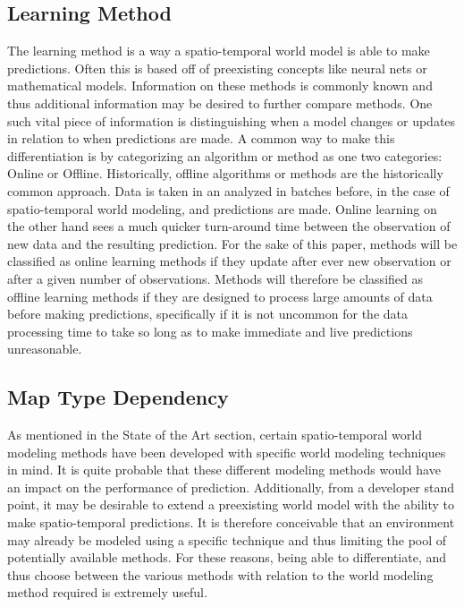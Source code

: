   \subsection{ Learning Method }
  The learning method is a way a spatio-temporal world model is able to
  make predictions. Often this is based off of preexisting concepts like neural
  nets or mathematical models. Information on these methods is commonly known
  and thus additional information may be desired to further compare methods.
  One such vital piece of information is distinguishing when a model
  changes or updates in relation to when predictions are made. A common way to
  make this differentiation is by categorizing an algorithm or method as one
  two categories: Online or Offline. Historically, offline algorithms or methods are the
  historically common approach. Data is taken in an analyzed in batches before,
  in the case of spatio-temporal world modeling, and predictions are made. Online
  learning on the other hand sees a much quicker turn-around time between the
  observation of new data and the resulting prediction. \cite{Karp1992} For the sake of this
  paper, methods will be classified as online learning methods if they update
  after ever new observation or after a given number of observations. Methods
  will therefore be classified as offline learning methods if they are designed to
  process large amounts of data before making predictions, specifically if it
  is not uncommon for the data processing time to take so long as to make
  immediate and live predictions unreasonable. \\

  \subsection{ Map Type Dependency }
  As mentioned in the State of the Art section, certain spatio-temporal world
  modeling methods have been developed with specific world modeling techniques in
  mind. It is quite probable that these different modeling methods would
  have an impact on the performance of prediction. Additionally,
  from a developer stand point, it may be desirable to extend a preexisting
  world model with the ability to make spatio-temporal predictions. It is
  therefore conceivable that an environment may already be modeled using a
  specific technique and thus limiting the pool of potentially available methods.
  For these reasons, being able to differentiate, and thus choose
  between the various methods with relation to the world modeling method
  required is extremely useful. \\



